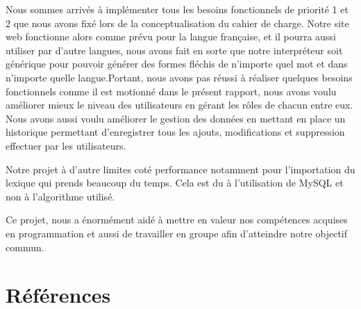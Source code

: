 \documentclass[12pt,a4paper]{article}
\begin{document}
  Nous sommes arrivés à implémenter tous les besoins fonctionnels de priorité 1 et 2 que nous avons fixé lors de la conceptualisation du cahier de charge.
Notre site web fonctionne alors comme prévu pour la langue française, et il pourra aussi utiliser par d'autre langues, nous avons fait en sorte que notre interpréteur soit générique pour pouvoir générer des formes fléchis de n'importe quel mot et dans n'importe quelle langue.Portant, nous avons pas réussi à réaliser quelques besoins fonctionnels comme il est motionné dans le présent rapport, 
nous avons voulu améliorer mieux le niveau des utilisateurs en gérant les rôles de chacun entre eux. Nous avons aussi voulu améliorer le gestion des données 
en mettant en place un historique permettant d'enregistrer tous les ajouts, modifications et suppression effectuer par les utilisateurs. 

 Notre projet à d'autre limites coté performance notamment pour l'importation du lexique qui prends beaucoup du temps. Cela est du à l'utilisation de MySQL 
et non à l'algorithme utilisé.

 Ce projet, nous a énormément aidé à mettre en valeur nos compétences acquises en programmation et aussi de travailler en groupe afin d'atteindre notre objectif commun. 

\section{Références}
\end{document}

